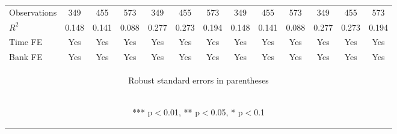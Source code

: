 \documentclass[]{article}
\begin{document}
\begin{center}
\begin{tabular}{lcccccccccccc}
Observations & 349 & 455 & 573 & 349 & 455 & 573 & 349 & 455 & 573 & 349 & 455 & 573 \\
$R^2$ & 0.148 & 0.141 & 0.088 & 0.277 & 0.273 & 0.194 & 0.148 & 0.141 & 0.088 & 0.277 & 0.273 & 0.194 \\
Time FE & Yes & Yes & Yes & Yes & Yes & Yes & Yes & Yes & Yes & Yes & Yes & Yes \\
 Bank FE & Yes & Yes & Yes & Yes & Yes & Yes & Yes & Yes & Yes & Yes & Yes & Yes \\ \hline
\multicolumn{13}{c}{\begin{footnotesize} Robust standard errors in parentheses\end{footnotesize}} \\
\multicolumn{13}{c}{\begin{footnotesize} *** p$<$0.01, ** p$<$0.05, * p$<$0.1\end{footnotesize}} \\
\end{tabular}
\end{center}
\end{document}
